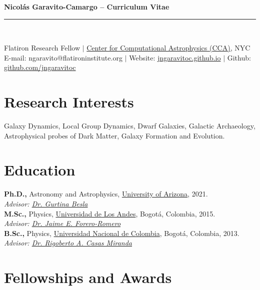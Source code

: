 \documentclass[UTF8]{article}
\begin{document}
\begin{center}
\indent \textbf{\LARGE Nicol\'as Garavito-Camargo -- Curriculum Vitae} \\
\indent \rule{17cm}{0.4pt}\\
\end{center}

\begin{center}
  Flatiron Research Fellow $|$ \href{https://www.simonsfoundation.org/flatiron/center-for-computational-astrophysics/} {Center for Computational Astrophysics
(CCA)}, NYC\\
E-mail: ngaravito@flatironinstitute.org $|$ Website:
\href{http://jngaravitoc.github.io/Garavito-Camargo}{jngaravitoc.github.io} $|$ Github: \href{http://www.github.com/jngaravitoc}{github.com/jngaravitoc}\\
\end{center}
\section*{Research Interests}
Galaxy Dynamics, Local Group Dynamics, Dwarf Galaxies, Galactic
Archaeology, Astrophysical probes of Dark Matter, Galaxy Formation and Evolution.

\section*{Education}
\textbf{Ph.D.,} Astronomy and Astrophysics, \href{https://www.as.arizona.edu/}{University of Arizona}, 2021.\\
\indent \textit{Advisor: \href{https://sites.google.com/view/thebeslagroup/home}{Dr. Gurtina Besla}}\\
\textbf{M.Sc.,}  Physics, \href{https://fisica.uniandes.edu.co/en}{Universidad de Los Andes}, Bogot\'a, Colombia, 2015.\\
\indent \textit{Advisor: \href{http://wwwprof.uniandes.edu.co/~je.forero/}{Dr. Jaime E. Forero-Romero}}\\
\textbf{B.Sc.,} Physics,
\href{https://unal.edu.co/en.html}{Universidad Nacional de Colombia}, Bogot\'a, Colombia, 2013.\\
\indent \textit{Advisor:
\href{https://www.iau.org/administration/membership/individual/16146/}{Dr.
Rigoberto A. Casas Miranda}}
\section*{Fellowships and Awards}
\end{document}
